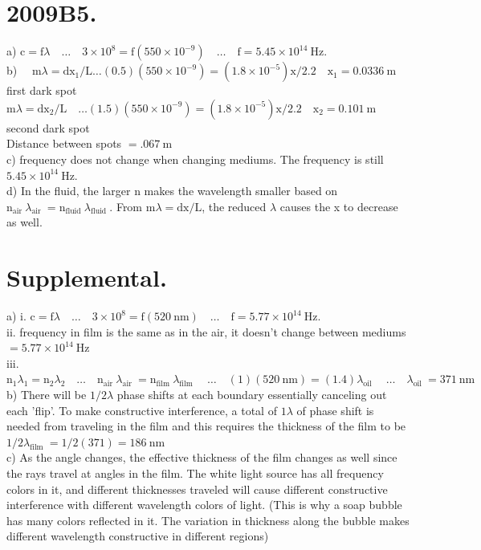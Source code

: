 \begin{enumerate}
\section*{2009B5.}
a) $\mathrm{c}=\mathrm{f} \lambda \quad \ldots \quad 3 \times 10^{8}=\mathrm{f}\left(550 \times 10^{-9}\right) \quad \ldots \quad \mathrm{f}=5.45 \times 10^{14} \mathrm{~Hz}$.\\
b) $\quad \mathrm{m} \lambda=\mathrm{d} \mathrm{x}_{1} / \mathrm{L} \ldots(0.5)\left(550 \times 10^{-9}\right)=\left(1.8 \times 10^{-5}\right) \mathrm{x} / 2.2 \quad \mathrm{x}_{1}=0.0336 \mathrm{~m}$ first dark spot\\
$\mathrm{m} \lambda=\mathrm{d} \mathrm{x}_{2} / \mathrm{L} \quad \ldots(1.5)\left(550 \times 10^{-9}\right)=\left(1.8 \times 10^{-5}\right) \mathrm{x} / 2.2 \quad \mathrm{x}_{2}=0.101 \mathrm{~m}$ second dark spot\\
Distance between spots $=.067 \mathrm{~m}$\\
c) frequency does not change when changing mediums. The frequency is still $5.45 \times 10^{14} \mathrm{~Hz}$.\\
d) In the fluid, the larger n makes the wavelength smaller based on $\mathrm{n}_{\text {air }} \lambda_{\text {air }}=\mathrm{n}_{\text {fluid }} \lambda_{\text {fluid }}$. From $\mathrm{m} \lambda=\mathrm{dx} / \mathrm{L}$, the reduced $\lambda$ causes the x to decrease as well.

\section*{Supplemental.}
a) i. $\mathrm{c}=\mathrm{f} \lambda \quad \ldots \quad 3 \times 10^{8}=\mathrm{f}(520 \mathrm{~nm}) \quad \ldots \quad \mathrm{f}=5.77 \times 10^{14} \mathrm{~Hz}$.\\
ii. frequency in film is the same as in the air, it doesn't change between mediums $=5.77 \times 10^{14} \mathrm{~Hz}$\\
iii. $\mathrm{n}_{1} \lambda_{1}=\mathrm{n}_{2} \lambda_{2} \quad \ldots \quad \mathrm{n}_{\text {air }} \lambda_{\text {air }}=\mathrm{n}_{\text {film }} \lambda_{\text {film }} \quad \ldots \quad(1)(520 \mathrm{~nm})=(1.4) \lambda_{\text {oil }} \quad \ldots \quad \lambda_{\text {oil }}=371 \mathrm{~nm}$\\
b) There will be $1 / 2 \lambda$ phase shifts at each boundary essentially canceling out each 'flip'. To make constructive interference, a total of $1 \lambda$ of phase shift is needed from traveling in the film and this requires the thickness of the film to be $1 / 2 \lambda_{\text {film }}=1 / 2(371)=186 \mathrm{~nm}$\\
c) As the angle changes, the effective thickness of the film changes as well since the rays travel at angles in the film. The white light source has all frequency colors in it, and different thicknesses traveled will cause different constructive interference with different wavelength colors of light. (This is why a soap bubble has many colors reflected in it. The variation in thickness along the bubble makes different wavelength constructive in different regions)


\end{enumerate}
